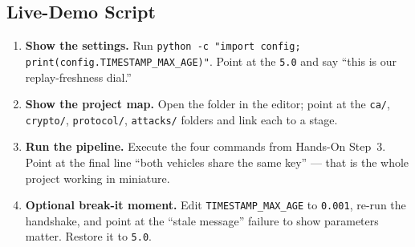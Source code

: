 \documentclass[11pt,a4paper]{article}
\begin{document}
\subsection{Live-Demo Script}
\begin{enumerate}
  \item \textbf{Show the settings.} Run
        \texttt{python -c "import config; print(config.TIMESTAMP\_MAX\_AGE)"}.
        Point at the \texttt{5.0} and say ``this is our replay-freshness dial.''
  \item \textbf{Show the project map.} Open the folder in the editor; point at
        the \texttt{ca/}, \texttt{crypto/}, \texttt{protocol/}, \texttt{attacks/}
        folders and link each to a stage.
  \item \textbf{Run the pipeline.} Execute the four commands from
        Hands-On Step~3. Point at the final line ``both vehicles share the same
        key'' --- that is the whole project working in miniature.
  \item \textbf{Optional break-it moment.} Edit \texttt{TIMESTAMP\_MAX\_AGE} to
        \texttt{0.001}, re-run the handshake, and point at the ``stale message''
        failure to show parameters matter. Restore it to \texttt{5.0}.
\end{enumerate}
\end{document}
